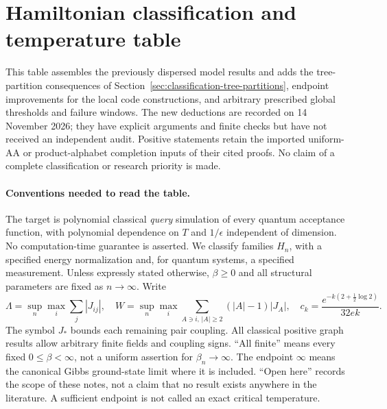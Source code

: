\section{Hamiltonian classification and temperature table}
\label{sec:hamiltonian-classification}

This table assembles the previously dispersed model results and adds
the tree-partition consequences of
Section~\ref{sec:classification-tree-partitions}, endpoint improvements
for the local code constructions, and arbitrary prescribed global
thresholds and failure windows. The new deductions are recorded on
14 November 2026; they have explicit arguments and finite checks but
have not received an independent audit. Positive statements retain
the imported uniform-AA or product-alphabet completion inputs of
their cited proofs. No claim of a complete classification or research
priority is made.

\paragraph{Conventions needed to read the table.}
The target is polynomial classical \emph{query} simulation of every
quantum acceptance function, with polynomial dependence on $T$ and
$1/\epsilon$ independent of dimension. No computation-time guarantee
is asserted. We classify families $H_n$, with a specified energy
normalization and, for quantum systems, a specified measurement.
Unless expressly stated otherwise, $\beta\ge0$ and all structural
parameters are fixed as $n\to\infty$. Write
\[
 \Lambda=\sup_n\max_i\sum_j|J_{ij}|,\quad
 W=\sup_n\max_i\sum_{A\ni i,\,|A|\ge2}(|A|-1)|J_A|,
 \quad c_k=\frac{e^{-k(2+\frac12\log2)}}{32ek}.
\]
The symbol $J_*$ bounds each remaining pair coupling. All classical
positive graph results allow arbitrary finite fields and coupling
signs. ``All finite'' means every fixed $0\le\beta<\infty$, not
a uniform assertion for $\beta_n\to\infty$. The endpoint $\infty$
means the canonical Gibbs ground-state limit where it is included.
``Open here'' records the scope of these notes, not a claim that no
result exists anywhere in the literature. A sufficient endpoint is
not called an exact critical temperature.

